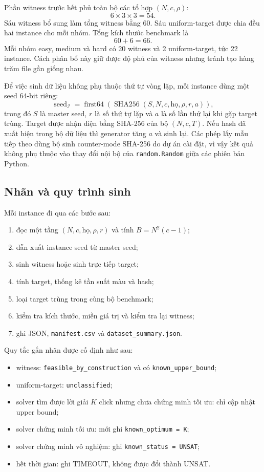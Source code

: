 \documentclass[11pt,a4paper]{article}
\newcommand{\I}{\mathcal{I}}
\begin{document}
Phần witness trước hết phủ toàn bộ các tổ hợp $(N,c,\rho)$:
\[
  6\times3\times3=54.
\]
Sáu witness bổ sung làm tổng witness bằng 60. Sáu uniform-target được chia
đều hai instance cho mỗi nhóm. Tổng kích thước benchmark là
\[
  60+6=66.
\]
Mỗi nhóm easy, medium và hard có 20 witness và 2 uniform-target, tức 22
instance. Cách phân bổ này giữ được độ phủ của witness nhưng tránh tạo hàng
trăm file gần giống nhau.

Để việc sinh dữ liệu không phụ thuộc thứ tự vòng lặp, mỗi instance dùng một
seed 64-bit riêng:
\[
  \operatorname{seed}_{\I}
  =\operatorname{first64}\!\left(
  \operatorname{SHA256}(S,N,c,\text{họ},\rho,r,a)\right),
\]
trong đó $S$ là master seed, $r$ là số thứ tự lặp và $a$ là số lần thử lại
khi gặp target trùng. Target được nhận diện bằng SHA-256 của bộ $(N,c,T)$.
Nếu hash đã xuất hiện trong bộ dữ liệu thì generator tăng $a$ và sinh lại.
Các phép lấy mẫu tiếp theo dùng bộ sinh counter-mode SHA-256 do dự án cài
đặt, vì vậy kết quả không phụ thuộc vào thay đổi nội bộ của
\texttt{random.Random} giữa các phiên bản Python.

\subsection{Nhãn và quy trình sinh}

Mỗi instance đi qua các bước sau:

\begin{enumerate}
  \item đọc một tầng $(N,c,\text{họ},\rho,r)$ và tính
        $B=N^2(c-1)$;
  \item dẫn xuất instance seed từ master seed;
  \item sinh witness hoặc sinh trực tiếp target;
  \item tính target, thống kê tần suất màu và hash;
  \item loại target trùng trong cùng bộ benchmark;
  \item kiểm tra kích thước, miền giá trị và kiểm tra lại witness;
  \item ghi JSON, \texttt{manifest.csv} và
        \texttt{dataset\_summary.json}.
\end{enumerate}

Quy tắc gắn nhãn được cố định như sau:

\begin{itemize}
  \item witness: \texttt{feasible\_by\_construction} và có
        \texttt{known\_upper\_bound};
  \item uniform-target: \texttt{unclassified};
  \item solver tìm được lời giải $K$ click nhưng chưa chứng minh tối ưu:
        chỉ cập nhật upper bound;
  \item solver chứng minh tối ưu: mới ghi \texttt{known\_optimum = K};
  \item solver chứng minh vô nghiệm: ghi \texttt{known\_status = UNSAT};
  \item hết thời gian: ghi TIMEOUT, không được đổi thành UNSAT.
\end{itemize}
\end{document}
